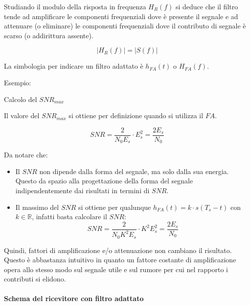 \documentclass{article}
\begin{document}
Studiando il modulo della risposta in frequenza \( H_R(f) \) si deduce che il filtro tende ad amplificare le componenti frequenziali dove è presente il segnale e ad attenuare (o eliminare) le componenti frequenziali dove il contributo di segnale è scarso (o addirittura assente).

\[
\left| H_R(f) \right| = \left| S(f) \right|
\]

La simbologia per indicare un filtro adattato è \( h_{FA}(t) \) o \( H_{FA}(f) \).

Esempio:


Calcolo del \( SNR_{max} \)

Il valore del \( SNR_{max} \) si ottiene per definizione quando si utilizza il \( FA \).

\[
SNR = \frac{2}{N_0 E_s} \cdot E_s^2 = \frac{2E_s}{N_0}
\]

Da notare che:

\begin{itemize}
    \item Il \( SNR \) non dipende dalla forma del segnale, ma solo dalla sua energia. Questo da spazio alla progettazione della forma del segnale indipendentemente dai risultati in termini di \( SNR \).
    \item Il massimo del \( SNR \) si ottiene per qualunque \( h_{FA}(t) = k \cdot s(T_s-t) \) con \( k \in \mathbb{R} \), infatti basta calcolare il $SNR$:
    \[ SNR = \frac{2}{N_0K^2 E_s} \cdot K^2 E_s^2 = \frac{2 E_s}{N_0} \]
\end{itemize}

Quindi, fattori di amplificazione e/o attenuazione non cambiano il risultato. Questo è abbastanza intuitivo in quanto un fattore costante di amplificazione opera allo stesso modo sul segnale utile e sul rumore per cui nel rapporto i contributi si elidono.

\paragraph*{Schema del ricevitore con filtro adattato}
\end{document}
